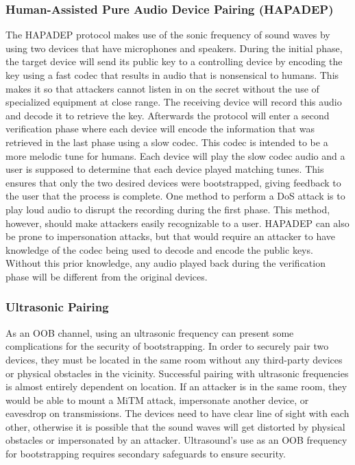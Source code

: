 \subsubsection{Human-Assisted Pure Audio Device Pairing (HAPADEP)}
The HAPADEP protocol makes use of the sonic frequency of sound waves by using two devices that have microphones and speakers. During the initial phase, the target device will send its public key to a controlling device by encoding the key using a fast codec that results in audio that is nonsensical to humans. This makes it so that attackers cannot listen in on the secret without the use of specialized equipment at close range. The receiving device will record this audio and decode it to retrieve the key. Afterwards the protocol will enter a second verification phase where each device will encode the information that was retrieved in the last phase using a slow codec. This codec is intended to be a more melodic tune for humans. Each device will play the slow codec audio and a user is supposed to determine that each device played matching tunes. This ensures that only the two desired devices were bootstrapped, giving feedback to the user that the process is complete. One method to perform a DoS attack is to play loud audio to disrupt the recording during the first phase. This method, however, should make attackers easily recognizable to a user. HAPADEP can also be prone to impersonation attacks, but that would require an attacker to have knowledge of the codec being used to decode and encode the public keys. Without this prior knowledge, any audio played back during the verification phase will be different from the original devices.

\subsubsection{Ultrasonic Pairing}
As an OOB channel, using an ultrasonic frequency can present some complications for the security of bootstrapping. In order to securely pair two devices, they must be located in the same room without any third-party devices or physical obstacles in the vicinity. Successful pairing with ultrasonic frequencies is almost entirely dependent on location. If an attacker is in the same room, they would be able to mount a MiTM attack, impersonate another device, or eavesdrop on transmissions. The devices need to have clear line of sight with each other, otherwise it is possible that the sound waves will get distorted by physical obstacles or impersonated by an attacker. Ultrasound’s use as an OOB frequency for bootstrapping requires secondary safeguards to ensure security.


